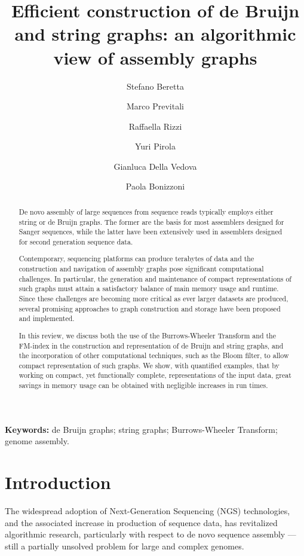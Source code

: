 \documentclass[11pt,oneside,a4paper]{article}
\begin{document}
\title{Efficient construction of de Bruijn and string graphs:
an algorithmic view of assembly graphs}

\author[1]{Stefano Beretta}
\author[1]{Marco Previtali}
\author[1]{Raffaella Rizzi}
\author[1]{Yuri Pirola}	
\author[1]{Gianluca Della Vedova}
\author[1]{Paola Bonizzoni}


\date{}

\maketitle

\textbf{Keywords:} de Bruijn graphs;
string graphs;
Burrows-Wheeler Transform;
genome assembly.


\begin{abstract}
De novo assembly of large sequences from sequence reads typically employs
either string or de Bruijn graphs.
%
The former are the basis for most assemblers designed for Sanger sequences,
while the latter have been extensively used in assemblers designed for second
generation sequence data.

Contemporary, sequencing platforms can produce terabytes of data and the
construction and navigation of assembly graphs pose significant computational
challenges.
%
In particular, the generation and maintenance of compact representations of
such graphs must attain a satisfactory balance of main memory usage and runtime.
%
Since these challenges are becoming more critical as ever larger datasets are
produced, several promising approaches to graph construction and storage have
been proposed and implemented.

In this review, we discuss both the use of the Burrows-Wheeler Transform and the FM-index in the construction and representation of de Bruijn and string graphs, and the incorporation of other computational techniques, such as the Bloom filter, to allow compact representation of such graphs.
%
We show, with quantified examples, that by working on compact, yet functionally complete, representations of the input data, great savings in memory usage can be obtained with negligible increases in run times.
\end{abstract}

\section{Introduction}
The widespread adoption of Next-Generation Sequencing (NGS) technologies,
and the associated increase in production of sequence data, has revitalized
algorithmic research, particularly with respect to de novo sequence
assembly --- still a partially unsolved problem for large and complex genomes.
\end{document}
